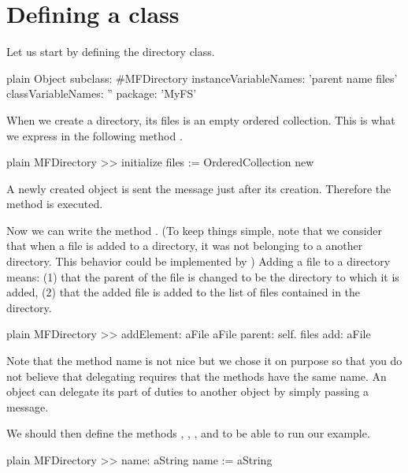 \documentclass[10pt,twoside,english]{_support/latex/sbabook/sbabook}
\begin{document}
\section{Defining a class}
Let us start by defining the directory class. 

\begin{displaycode}{plain}
Object subclass: #MFDirectory
	instanceVariableNames: 'parent name files'
	classVariableNames: ''
	package: 'MyFS'
\end{displaycode}

When we create a directory, its files is an empty ordered collection. This is what we express in the following method .

\begin{displaycode}{plain}
MFDirectory >> initialize
	files := OrderedCollection new
\end{displaycode}

A newly created object is sent the message  just after its creation. Therefore the  method is executed. 

Now we can write the method . 
(To keep things simple, note that we consider that when a file is added to a directory, it was not belonging to a another directory. This behavior could be implemented by )
Adding a file to a directory means: (1) that the parent of the file is changed to be the directory to which it is added, (2) that the added file is added to the list of files contained in the directory.

\begin{displaycode}{plain}
MFDirectory >> addElement: aFile
	aFile parent: self. 
	files add: aFile
\end{displaycode}

Note that the method name  is not nice but we chose it on purpose so that you do not believe that delegating
requires that the methods have the same name. An object can delegate its part of duties to another object by simply passing a message. 

We should then define the methods , , , and  to be able to run our example.

\begin{displaycode}{plain}
MFDirectory >> name: aString
	name := aString
\end{displaycode}
\end{document}
